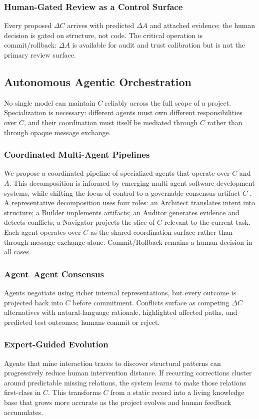 \subsubsection{Human-Gated Review as a Control Surface}
Every proposed $\Delta C$ arrives with predicted $\Delta A$ and attached evidence; the human decision is gated on structure, not code.
The critical operation is commit/rollback: $\Delta A$ is available for audit and trust calibration but is not the primary review surface.

\subsection{Autonomous Agentic Orchestration}
No single model can maintain $C$ reliably across the full scope of a project. Specialization is necessary: different agents must own different responsibilities over $C$, and their coordination must itself be mediated through $C$ rather than through opaque message exchange.

\subsubsection{Coordinated Multi-Agent Pipelines}
We propose a coordinated pipeline of specialized agents that operate over $C$ and $A$.
This decomposition is informed by emerging multi-agent software-development systems, while shifting the locus of control to a governable consensus artifact $C$ \cite{hong2024metagpt,qian2024chatdev,li2025aidev,wang2025genmentor}.
A representative decomposition uses four roles: an Architect translates intent into structure; a Builder implements artifacts; an Auditor generates evidence and detects conflicts; a Navigator projects the slice of $C$ relevant to the current task. Each agent operates over $C$ as the shared coordination surface rather than through message exchange alone.
Commit/Rollback remains a human decision in all cases.

\subsubsection{Agent--Agent Consensus}
Agents negotiate using richer internal representations, but every outcome is projected back into $C$ before commitment. Conflicts surface as competing $\Delta C$ alternatives with natural-language rationale, highlighted affected paths, and predicted test outcomes; humans commit or reject.

\subsubsection{Expert-Guided Evolution}
Agents that mine interaction traces to discover structural patterns can progressively reduce human intervention distance. 
If recurring corrections cluster around predictable missing relations, the system learns to make those relations first-class in $C$.
This transforms $C$ from a static record into a living knowledge base that grows more accurate as the project evolves and human feedback accumulates.

